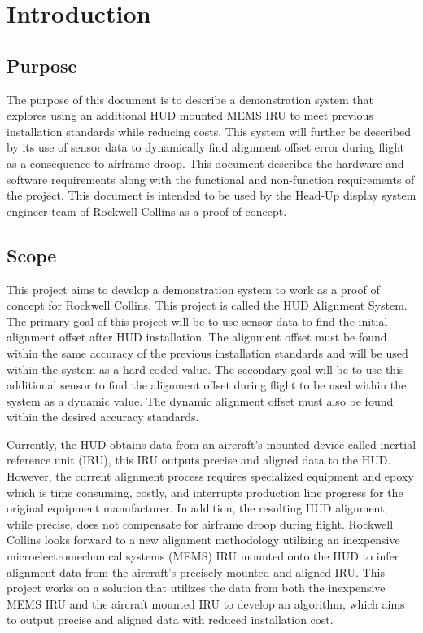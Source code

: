 

\section{Introduction}
\subsection{Purpose}
The purpose of this document is to describe a demonstration system that explores using an additional HUD mounted MEMS IRU to meet previous installation standards while reducing costs. This system will further be described by its use of sensor data to dynamically find alignment offset error during flight as a consequence to airframe droop. This document describes the hardware and software requirements along with the functional and non-function requirements of the project. This document is intended to be used by the Head-Up display system engineer team of Rockwell Collins as a proof of concept. 

\subsection{Scope}
This project aims to develop a demonstration system to work as a proof of concept for Rockwell Collins. This project is called the HUD Alignment System. The primary goal of this project will be to use sensor data to find the initial alignment offset after HUD installation. The alignment offset must be found within the same accuracy of the previous installation standards and will be used within the system as a hard coded value. The secondary goal will be to use this additional sensor to find the alignment offset during flight to be used within the system as a dynamic value. The dynamic alignment offset must also be found within the desired accuracy standards.\

Currently, the HUD obtains data from an aircraft’s mounted device called inertial reference unit (IRU), this IRU outputs precise and aligned data to the HUD. However, the current alignment process requires specialized equipment and epoxy which is time consuming, costly, and interrupts production line progress for the original equipment manufacturer. In addition, the resulting HUD alignment, while precise, does not compensate for airframe droop during flight. Rockwell Collins looks forward to a new alignment methodology utilizing an inexpensive microelectromechanical systems (MEMS) IRU mounted onto the HUD to infer alignment data from the aircraft’s precisely mounted and aligned IRU. This project works on a solution that utilizes the data from both the inexpensive MEMS IRU and the aircraft mounted IRU to develop an algorithm, which aims to output precise and aligned data with reduced installation cost.\

